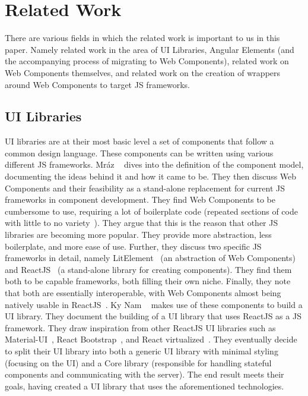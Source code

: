 \chapter{Related Work}\label{chap:related-work}

There are various fields in which the related work is important to us in this paper. Namely related work in the area of UI Libraries, Angular Elements (and the accompanying process of migrating to Web Components), related work on Web Components themselves, and related work on the creation of wrappers around Web Components to target JS frameworks.

\section{UI Libraries}
UI libraries are at their most basic level a set of components that follow a common design language. These components can be written using various different JS frameworks. Mráz \etal{}~\cite{mrazcomponent} dives into the definition of the component model, documenting the ideas behind it and how it came to be. They then discuss Web Components and their feasibility as a stand-alone replacement for current JS frameworks in component development. They find Web Components to be cumbersome to use, requiring a lot of boilerplate code (repeated sections of code with little to no variety~\cite{inproceedings}). They argue that this is the reason that other JS libraries are becoming more popular. They provide more abstraction, less boilerplate, and more ease of use. Further, they discuss two specific JS frameworks in detail, namely LitElement~ (an abstraction of Web Components) and ReactJS~ (a stand-alone library for creating components). They find them both to be capable frameworks, both filling their own niche. Finally, they note that both are essentially interoperable, with Web Components almost being natively usable in ReactJS~.
Ky Nam \etal{}~\cite{ky2019ui} makes use of these components to build a UI library. They document the building of a UI library that uses ReactJS as a JS framework. They draw inspiration from other ReactJS UI libraries such as Material-UI~, React Bootstrap~, and React virtualized~. They eventually decide to split their UI library into both a generic UI library with minimal styling (focusing on the UI) and a Core library (responsible for handling stateful components and communicating with the server). The end result meets their goals, having created a UI library that uses the aforementioned technologies.
